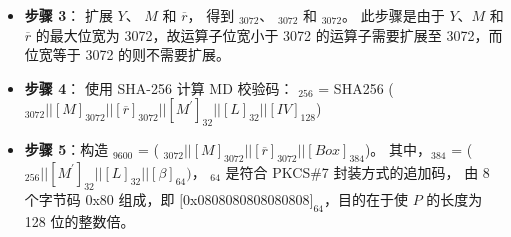 \documentclass[main\_\_CN.tex]{subfiles}
\begin{document}
\begin{itemize}
    \item {\bfseries 步骤 3}：
          扩展 \begin{math}Y\end{math}、
               \begin{math}M\end{math} 和 
               \begin{math}\overline{r}\end{math}，
          得到 \begin{math}[Y]_{3072}\end{math}、
               \begin{math}[M]_{3072}\end{math} 和
               \begin{math}[\overline{r}]_{3072}\end{math}。
          此步骤是由于 \begin{math}Y\end{math}、\begin{math}M\end{math} 和 \begin{math}\overline{r}\end{math} 的最大位宽为 3072，故运算子位宽小于 3072 的运算子需要扩展至 3072，而位宽等于 3072 的则不需要扩展。
       
    
    \item {\bfseries 步骤 4}：
            使用 SHA-256 计算 MD 校验码： 
                \begin{math}[MD]_{256}\end{math} = SHA256 (\begin{math} 
                [Y]_{3072} ||
                [M]_{3072} ||
                [\overline{r}]_{3072} ||
                [M^{\prime}]_{32} ||
                [L]_{32} ||
                [IV]_{128} 
            \end{math})

    \item {\bfseries 步骤 5}：构造 \begin{math}[P]_{9600}\end{math} = (
            \begin{math}
                [Y]_{3072} ||
                [M]_{3072} ||
                [\overline{r}]_{3072} ||
                [Box]_{384}
            \end{math})。
            其中，\begin{math}[Box]_{384}\end{math} = (
            \begin{math}
                [MD]_{256} ||
                [M^{\prime}]_{32} ||
                [L]_{32} ||
                [\beta]_{64}) 
            \end{math}，
            \begin{math}[\beta]_{64} \end{math} 是符合 PKCS\#7 封装方式的追加码， 由 8 个字节码 0x80 组成，即 $[$0x0808080808080808$]_{64}$，目的在于使 \begin{math}P\end{math} 的长度为 128 位的整数倍。
    

\end{itemize}
\end{document}
